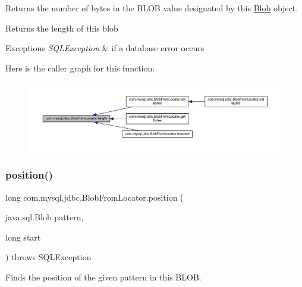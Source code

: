 Returns the number of bytes in the B\+L\+OB value designated by this \mbox{\hyperlink{classcom_1_1mysql_1_1jdbc_1_1_blob}{Blob}} object.

\begin{DoxyReturn}{Returns}
the length of this blob
\end{DoxyReturn}

\begin{DoxyExceptions}{Exceptions}
{\em S\+Q\+L\+Exception} & if a database error occurs \\
\hline
\end{DoxyExceptions}
Here is the caller graph for this function\+:\nopagebreak
\begin{figure}[H]
\begin{center}
\leavevmode
\includegraphics[width=350pt]{classcom_1_1mysql_1_1jdbc_1_1_blob_from_locator_a9fc208b550f8dfde5f07b1762e5db586_icgraph}
\end{center}
\end{figure}
\mbox{\label{classcom_1_1mysql_1_1jdbc_1_1_blob_from_locator_ae47c22c2882286bf6b4e2870ec0c8e1f}} 
\subsubsection{\texorpdfstring{position()}{position()}\hspace{0.1cm}{\footnotesize\ttfamily [1/2]}}
{\footnotesize\ttfamily long com.\+mysql.\+jdbc.\+Blob\+From\+Locator.\+position (\begin{DoxyParamCaption}\item[{java.\+sql.\+Blob}]{pattern,  }\item[{long}]{start }\end{DoxyParamCaption}) throws S\+Q\+L\+Exception}

Finds the position of the given pattern in this B\+L\+OB.


